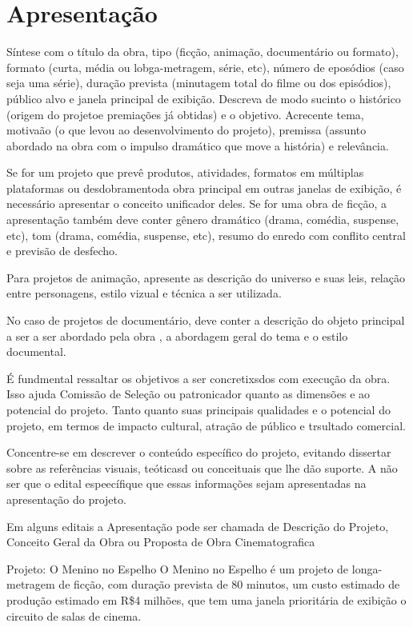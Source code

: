 \section{Apresentação}

Síntese com o título da obra, tipo (ficção, animação, documentário ou formato), formato (curta, média ou lobga-metragem, série, etc), número de eposódios (caso seja uma série), duração prevista (minutagem total do filme ou dos episódios), público alvo e janela principal de exibição. Descreva de modo sucinto o histórico (origem do projetoe premiações já obtidas) e o objetivo. Acrecente tema, motivaão (o que levou ao desenvolvimento do projeto), premissa (assunto abordado na obra com o impulso dramático que move a história) e relevância.

Se for um projeto que prevê produtos, atividades, formatos em múltiplas plataformas ou desdobramentoda obra principal em outras janelas de exibição, é necessário apresentar o conceito unificador deles.
Se for uma obra de ficção, a apresentação também deve conter gênero dramático (drama, comédia, suspense, etc), tom (drama, comédia, suspense, etc), resumo do enredo com conflito central e previsão de desfecho.

Para projetos de animação, apresente as descrição do universo e suas leis, relação entre personagens, estilo vizual e técnica a ser utilizada.

No caso de projetos de documentário, deve conter a descrição do objeto principal a ser a ser abordado pela obra , a abordagem geral do tema e o estilo documental.

É fundmental ressaltar os objetivos a ser concretixsdos com execução da obra. Isso ajuda Comissão de Seleção ou patronicador quanto as dimensões e ao potencial do projeto. Tanto quanto suas principais qualidades e o potencial do projeto, em termos de impacto cultural, atração de público e trsultado comercial.

Concentre-se em descrever o conteúdo específico do projeto, evitando dissertar sobre as referências visuais, teóticasd ou conceituais que lhe dão suporte. A não ser que o edital espeecífique que essas informações sejam apresentadas na apresentação do projeto.

Em alguns editais a Apresentação pode ser chamada de  Descrição do Projeto, Conceito Geral da Obra ou Proposta de Obra Cinematografica

Projeto: O Menino no Espelho
O Menino no Espelho é um projeto de longa-metragem de ficção, com duração prevista de 80 minutos, um custo estimado de produção estimado em R\$4 milhões, que tem uma janela prioritária de exibição o circuito de salas de cinema.

